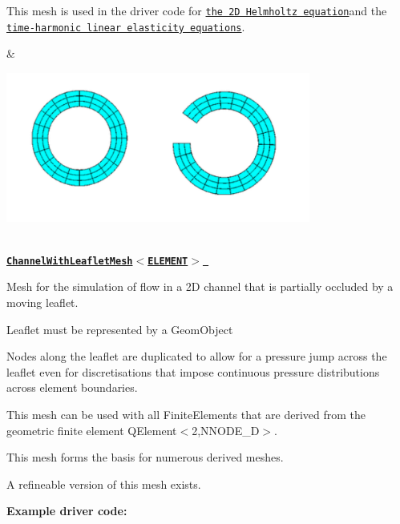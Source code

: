 \begin{center}
\begin{longtabu}
\begin{DoxyItemize}
\item This mesh is used in the driver code for \href{../../../helmholtz/scattering/html/index.html}{\tt the 2D Helmholtz equation}and the \href{../../../time_harmonic_linear_elasticity/elastic_annulus/html/index.html}{\tt time-\/harmonic linear elasticity equations}. 
\end{DoxyItemize}& 
\begin{DoxyImageNoCaption}
  \mbox{\includegraphics[width=0.75\textwidth]{annular_meshes}}
\end{DoxyImageNoCaption}
   \\
\label{_channel_with_leaflet}%
 \href{classoomph_1_1ChannelWithLeafletMesh.html}{\tt {\bfseries  Channel\+With\+Leaflet\+Mesh$<$\+E\+L\+E\+M\+E\+N\+T$>$ }} ~\newline
~\newline

\begin{DoxyItemize}
\item Mesh for the simulation of flow in a 2D channel that is partially occluded by a moving leaflet.
\item Leaflet must be represented by a {\ttfamily Geom\+Object} 
\item Nodes along the leaflet are duplicated to allow for a pressure jump across the leaflet even for discretisations that impose continuous pressure distributions across element boundaries.
\item This mesh can be used with all {\ttfamily Finite\+Elements} that are derived from the geometric finite element {\ttfamily Q\+Element$<$2,\+N\+N\+O\+D\+E\+\_\+D$>$}.
\item This mesh forms the basis for numerous derived meshes.
\item A refineable version of this mesh exists.
\end{DoxyItemize}{\bfseries Example driver code\+:} ~\newline


\end{longtabu}
\end{center}
